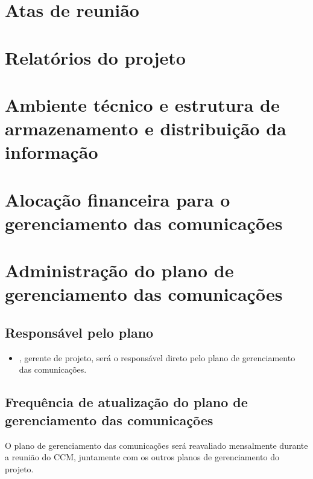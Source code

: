 \section{Atas de reunião}


\section{Relatórios do projeto}


\section{Ambiente técnico e estrutura de armazenamento e distribuição da informação}


\section{Alocação financeira para o gerenciamento das comunicações}


\section{Administração do plano de gerenciamento das comunicações}

\subsection{Responsável pelo plano}

\begin{itemize}
	\item \projectManagerName{}, gerente de projeto, será o responsável direto pelo plano de gerenciamento das comunicações.
\end{itemize}

\subsection{Frequência de atualização do plano de gerenciamento das comunicações}

O plano de gerenciamento das comunicações será reavaliado mensalmente durante a reunião do CCM, juntamente com os outros planos de gerenciamento do projeto.

